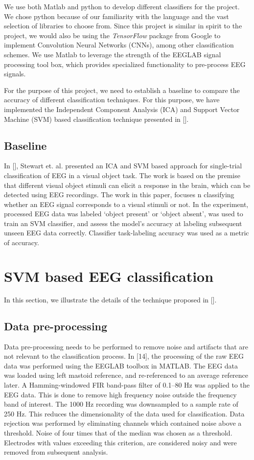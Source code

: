 \documentclass{article} %
\begin{document}
We use both Matlab and python to develop different classifiers for the project. We chose python because of our familiarity with the language and the vast selection of libraries to choose from. Since this project is similar in spirit to the  project, we would also be using the \textit{TensorFlow} package from Google to implement Convolution Neural Networks (CNNs), among other classification schemes. We use Matlab to leverage the strength of the EEGLAB signal processing tool box, which provides specialized functionality to pre-process EEG signals. 

For the purpose of this project, we need to establish a baseline to compare the accuracy of different classification techniques. For this purpose, we have implemented the Independent Component Analysis (ICA) and Support Vector Machine (SVM) based classification technique presented in [].

\subsection{Baseline}
In [], Stewart et. al. presented an ICA and SVM based approach for single-trial classification of EEG in a visual object task. The work is based on the premise that different visual object stimuli can elicit a response in the brain, which can be detected using EEG recordings. The work in this paper, focuses n classifying whether an EEG signal corresponds to a visual stimuli or not. In the experiment, processed EEG data was labeled  ‘object present’ or ‘object absent’, was used to train an SVM classifier,
and assess the model’s accuracy at labeling subsequent unseen EEG data correctly. Classifier task-labeling accuracy was used as a metric of accuracy. 

\section{SVM based EEG classification}
In this section, we illustrate the details of the technique proposed in [].

\subsection{Data pre-processing}
Data pre-processing needs to be performed to remove noise and artifacts that are not relevant to the classification process. In [14], the processing of the raw EEG data was performed using the EEGLAB toolbox \cite{eeglab} in MATLAB. The EEG data was loaded using left mastoid reference, and re-referenced to an average reference later. A Hamming-windowed FIR band-pass filter of 0.1–80 Hz was applied to the EEG data. This is done to remove high frequency noise outside the frequency band of interest. The 1000 Hz recording was downsampled to a sample rate of 250 Hz. This reduces the dimensionality of the data used for classification.
Data rejection was performed by eliminating channels which contained noise above a threshold. Noise of four times that of the median was chosen as a threshold. Electrodes with values exceeding this criterion, are considered noisy and were removed from subsequent analysis.
\end{document}
